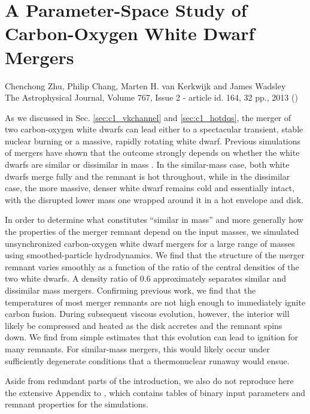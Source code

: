 \chapter{A Parameter-Space Study of Carbon-Oxygen White Dwarf Mergers}
\label{ch:ch2}

\begin{center}
\begin{minipage}[c]{4.75in}
Chenchong Zhu, Philip Chang, Marten H. van Kerkwijk and James Wadsley\\
The Astrophysical Journal, Volume 767, Issue 2 - article id. 164, 32 pp., 2013 (\citeal{zhu+13})
\vspace{2em}
\end{minipage}
\end{center}

As we discussed in Sec. \ref{sec:c1_vkchannel} and \ref{sec:c1_hotdqs}, the merger of two carbon-oxygen white dwarfs can lead either to a spectacular transient, stable nuclear burning or a massive, rapidly rotating white dwarf.  Previous simulations of mergers have shown that the outcome strongly depends on whether the white dwarfs are similar or dissimilar in mass \citep{loreig09}.  In the similar-mass case, both white dwarfs merge fully and the remnant is hot throughout, while in the dissimilar case, the more massive, denser white dwarf remains cold and essentially intact, with the disrupted lower mass one wrapped around it in a hot envelope and disk.

In order to determine what constitutes ``similar in mass'' and more generally how the properties of the merger remnant depend on the input masses, we simulated unsynchronized carbon-oxygen white dwarf mergers for a large range of masses using smoothed-particle hydrodynamics.  We find that the structure of the merger remnant varies smoothly as a function of the ratio of the central densities of the two white dwarfs.  A density ratio of 0.6 approximately separates similar and dissimilar mass mergers.  Confirming previous work, we find that the temperatures of most merger remnants are not high enough to immediately ignite carbon fusion.  During subsequent viscous evolution, however, the interior will likely be compressed and heated as the disk accretes and the remnant spins down.  We find from simple estimates that this evolution can lead to ignition for many remnants.  For similar-mass mergers, this would likely occur under sufficiently degenerate conditions that a thermonuclear runaway would ensue.

Aside from redundant parts of the introduction, we also do not reproduce here the extensive Appendix to \citeal{zhu+13}, which contains tables of binary input parameters and remnant properties for the simulations.
